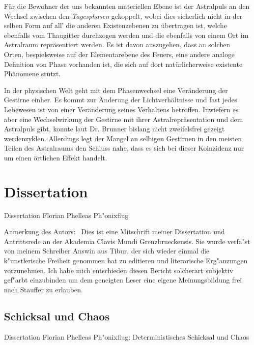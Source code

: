 \documentclass[a5paper,8pt]{book}
\begin{document}
\begin{multicols}{2}
Für die Bewohner der uns bekannten materiellen Ebene ist der Astralpuls an den Wechsel zwischen den \textit{Tagesphasen}
gekoppelt, wobei dies sicherlich nicht in der selben Form auf all' die anderen Existenzebenen zu übertragen ist,
welche ebenfalls vom Thaugitter durchzogen werden und die ebenfalls von einem Ort im Astralraum repräsentiert werden. Es
ist davon auszugehen, dass an solchen Orten, bespielsweise auf der Elementarebene des Feuers, eine andere analoge
Definition von Phase vorhanden ist, die sich auf dort natürlicherweise existente Phänomene stützt. 

In der physischen Welt geht mit dem Phasenwechsel eine Veränderung der Gestirne einher. Es kommt zur Änderung der
Lichtverhältnisse und fast jedes Lebewesen ist von einer Veränderung seines Verhaltens betroffen. Inwiefern es aber
eine Wechselwirkung der Gestirne mit ihrer Astralrepräsentation und dem Astralpuls gibt, konnte laut Dr.
Brunner bislang nicht zweifelsfrei gezeigt werdenzyklen. Allerdings legt der Mangel an selbigen Gestirnen in den meisten
Teilen des Astralraums den Schluss nahe, dass es sich bei dieser Koinzidenz nur um einen örtlichen Effekt handelt.

\end{multicols}

\newpage

\section{Dissertation}

Dissertation Florian Phelleas Ph"onixflug

Anmerkung des Autors:\
Dies ist eine Mitschrift meiner Dissertation und Antrittsrede an der Akademia Clavis Mundi Grenzbrueckensis. Sie wurde verfa"st von 
meinem Schreiber Answin aus Tibur, der sich wieder einmal die k"unstlerische Freiheit genommen hat zu editieren und literarische 
Erg"anzungen vorzunehmen. Ich habe mich entschieden diesen Bericht solcherart subjektiv gef"arbt einzubinden um dem geneigten Leser 
eine eigene Meinungsbildung frei nach Stauffer zu erlauben.

\newpage

\subsection{Schicksal und Chaos}

Dissertation Florian Phelleas Ph"onixflug: Deterministisches Schicksal und Chaos
\end{document}
